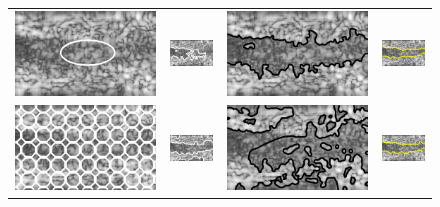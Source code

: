 \begin{figure}[b]
\centering
\renewcommand{\tabcolsep}{0.05cm}
\begin{tabular}{@{}cccc@{}}
			\includegraphics[width=.24\linewidth]{./images/DL2S/Initialization/init_ell} &
			\includegraphics[width=.24\linewidth]{./images/DL2S/Initialization/vessINVIVO02_CV_ell} &
			\includegraphics[width=.24\linewidth]{./images/DL2S/Initialization/vessINVIVO02_L2S_p2_ell} &
			\includegraphics[width=.24\linewidth]{./images/DL2S/Initialization/vessINVIVO02_DL_ell} 
			\\ 
			\includegraphics[width=.24\linewidth]{./images/DL2S/Initialization/init_mb} &
			\includegraphics[width=.24\linewidth]{./images/DL2S/Initialization/vessINVIVO02_CV_mb} &
			\includegraphics[width=.24\linewidth]{./images/DL2S/Initialization/vessINVIVO02_L2S_p2_mb} &
			\includegraphics[width=.24\linewidth]{./images/DL2S/Initialization/vessINVIVO02_DL_mb} 

\end{tabular}
\end{figure}
